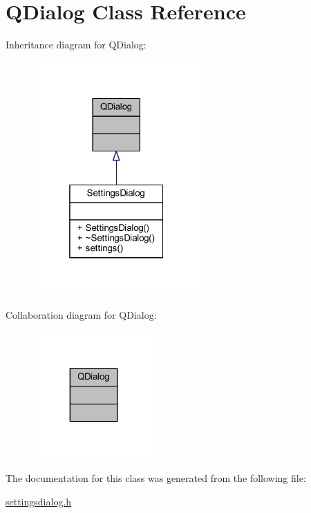 \hypertarget{a00009}{\section{Q\+Dialog Class Reference}
\label{a00009}
}


Inheritance diagram for Q\+Dialog\+:
\nopagebreak
\begin{figure}[H]
\begin{center}
\leavevmode
\includegraphics[width=181pt]{d8/d0a/a00292}
\end{center}
\end{figure}


Collaboration diagram for Q\+Dialog\+:
\nopagebreak
\begin{figure}[H]
\begin{center}
\leavevmode
\includegraphics[width=131pt]{d6/d82/a00293}
\end{center}
\end{figure}


The documentation for this class was generated from the following file\+:\begin{DoxyCompactItemize}
\item 
\hyperlink{a00045}{settingsdialog.\+h}\end{DoxyCompactItemize}
